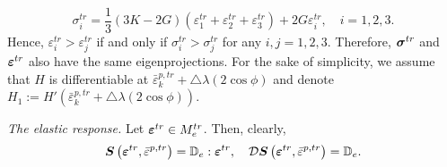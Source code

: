 \documentclass[a4paper,12pt]{article}
\theoremstyle{remark}
\newcommand{\mbf}[1]{\mbox{\boldmath$#1$}}
\numberwithin{equation}{section}
\begin{document}
\begin{equation}
\sigma_i^{tr}=\frac{1}{3}(3K-2G)(\varepsilon^{tr}_1+\varepsilon^{tr}_2+\varepsilon^{tr}_3)+2G\varepsilon^{tr}_i,\quad i=1,2,3.
\label{sigma_i^tr}
\end{equation}
Hence, $\varepsilon^{tr}_i>\varepsilon^{tr}_j$ if and only if $\sigma^{tr}_i>\sigma^{tr}_j$ for any $i,j=1,2,3$. Therefore, $\mbf{\sigma}^{tr}$ and $\mbf{\varepsilon}^{tr}$ also have the same eigenprojections.
For the sake of simplicity, we assume that $H$ is differentiable at $\bar{\varepsilon}^{p,tr}_{k}+\triangle\lambda (2\cos\phi)$ and denote $H_1:=H'(\bar{\varepsilon}^{p,tr}_{k}+\triangle\lambda (2\cos\phi))$.

\bigskip\noindent
{\it The elastic response.}  Let $\mbf{\varepsilon}^{tr}\in M^{tr}_{e}$. Then, clearly,
\begin{equation}
\mbf S\left(\mbf{\varepsilon}^{tr},\bar{\varepsilon}^{p,tr}\right)=\mathbb D_e:\mbf\varepsilon^{tr},\quad \mathcal D\mbf S\left(\mbf{\varepsilon}^{tr},\bar{\varepsilon}^{p,tr}\right)=\mathbb D_e.
\end{equation}
\end{document}
